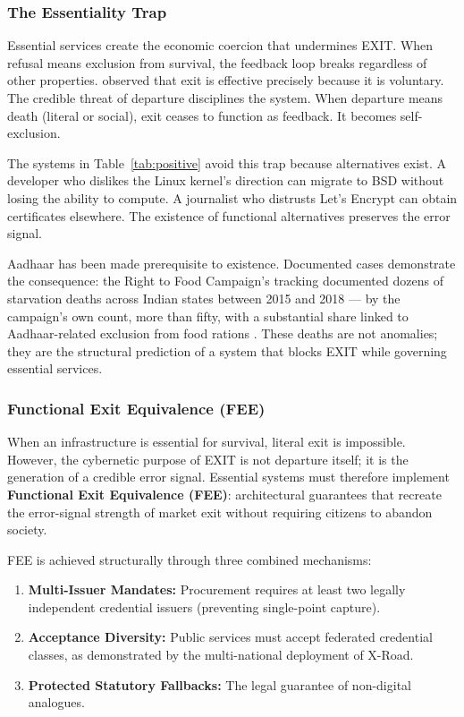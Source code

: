 \documentclass{article}
\begin{document}
\subsubsection{The Essentiality Trap}

Essential services create the economic coercion that undermines EXIT. When refusal means exclusion from survival, the feedback loop breaks regardless of other properties. \citet{hirschman1970} observed that exit is effective precisely because it is voluntary. The credible threat of departure disciplines the system. When departure means death (literal or social), exit ceases to function as feedback. It becomes self-exclusion.

The systems in Table~\ref{tab:positive} avoid this trap because alternatives exist. A developer who dislikes the Linux kernel's direction can migrate to BSD without losing the ability to compute. A journalist who distrusts Let's Encrypt can obtain certificates elsewhere. The existence of functional alternatives preserves the error signal.

Aadhaar has been made prerequisite to existence. Documented cases demonstrate the consequence: the Right to Food Campaign's tracking documented dozens of starvation deaths across Indian states between 2015 and 2018 --- by the campaign's own count, more than fifty, with a substantial share linked to Aadhaar-related exclusion from food rations \citep{rtfc2018,khera2017}. These deaths are not anomalies; they are the structural prediction of a system that blocks EXIT while governing essential services.

\subsubsection{Functional Exit Equivalence (FEE)}
\label{subsubsec:fee}

When an infrastructure is essential for survival, literal exit is impossible. However, the cybernetic purpose of EXIT is not departure itself; it is the generation of a credible error signal. Essential systems must therefore implement \textbf{Functional Exit Equivalence (FEE)}: architectural guarantees that recreate the error-signal strength of market exit without requiring citizens to abandon society.

FEE is achieved structurally through three combined mechanisms:
\begin{enumerate}[noitemsep]
    \item \textbf{Multi-Issuer Mandates:} Procurement requires at least two legally independent credential issuers (preventing single-point capture).
    \item \textbf{Acceptance Diversity:} Public services must accept federated credential classes, as demonstrated by the multi-national deployment of X-Road.
    \item \textbf{Protected Statutory Fallbacks:} The legal guarantee of non-digital analogues.
\end{enumerate}
\end{document}
